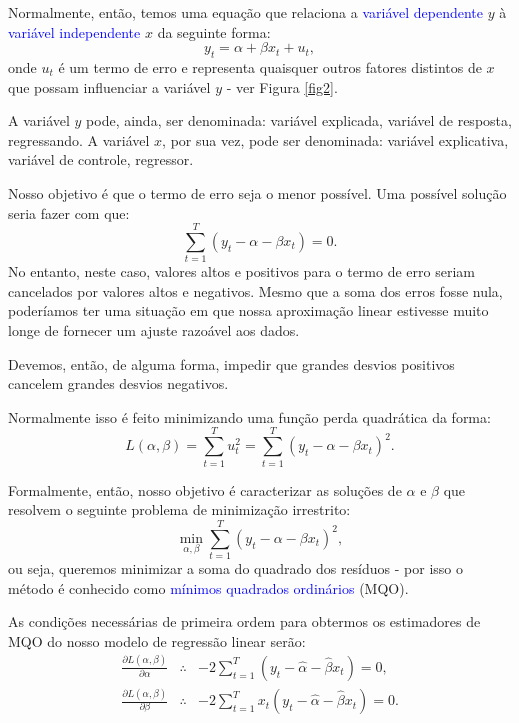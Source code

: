 \documentclass[preprintnumbers,nofootinbib,amsmath,amssymb,12pt]{article}
\begin{document}
    Normalmente, então, temos uma equação que relaciona a \textcolor{blue}{variável dependente} $y$ à \textcolor{blue}{variável independente} $x$ da seguinte forma:
    \begin{equation}
        y_t = \alpha + \beta x_t + u_t,
        \label{eq22}
    \end{equation}
    onde $u_t$ é um termo de erro e representa quaisquer outros fatores distintos de $x$ que possam influenciar a variável $y$ - ver Figura \ref{fig2}.
    
    A variável $y$ pode, ainda, ser denominada: variável explicada, variável de resposta, regressando. A variável $x$, por sua vez, pode ser denominada: variável explicativa, variável de controle, regressor.
    
    Nosso objetivo é que o termo de erro seja o menor possível. Uma possível solução seria fazer com que:
    \[
    \sum_{t=1}^T (y_t - \alpha - \beta x_t) = 0.
    \]
    No entanto, neste caso, valores altos e positivos para o termo de erro seriam cancelados por valores altos e negativos. Mesmo que a soma dos erros fosse nula, poderíamos ter uma situação em que nossa aproximação linear estivesse muito longe de fornecer um ajuste razoável aos dados.
    
    Devemos, então, de alguma forma, impedir que grandes desvios positivos cancelem grandes desvios negativos.
    
    Normalmente isso é feito minimizando uma função perda quadrática da forma:
    \begin{equation}
        L(\alpha, \beta) = \sum_{t=1}^T u_t^2 = \sum_{t=1}^T (y_t - \alpha - \beta x_t)^2.
        \label{eq23}
    \end{equation}
    
    Formalmente, então, nosso objetivo é caracterizar as soluções de $\hat{\alpha}$ e $\hat{\beta}$ que resolvem o seguinte problema de minimização irrestrito:
    \begin{equation}
        \min_{\alpha, \beta} \sum_{t=1}^T (y_t - \alpha - \beta x_t)^2,
        \label{eq24}
    \end{equation}
    ou seja, queremos minimizar a soma do quadrado dos resíduos - por isso o método é conhecido como \textcolor{blue}{mínimos quadrados ordinários} (MQO).
    
    As condições necessárias de primeira ordem para obtermos os estimadores de MQO do nosso modelo de regressão linear serão:
    \begin{eqnarray}
    \frac{\partial L(\alpha, \beta)}{\partial \alpha} &\therefore& -2\sum_{t=1}^T (y_t - \hat{\alpha} - \hat{\beta}x_t) = 0, \label{eq25} \\
    \frac{\partial L(\alpha, \beta)}{\partial \beta} &\therefore& -2\sum_{t=1}^T x_t(y_t - \hat{\alpha} - \hat{\beta}x_t) = 0. \label{eq26}
    \end{eqnarray}
    
\end{document}
